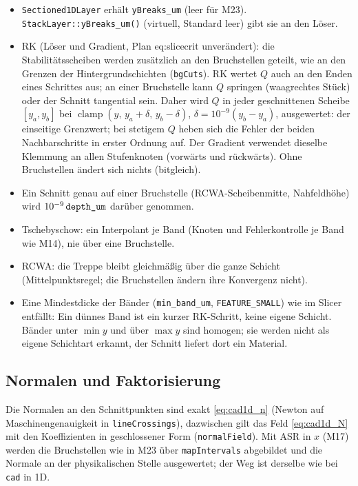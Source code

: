 \begin{itemize}[nosep]
  \item \verb|Sectioned1DLayer| erhält \verb|yBreaks_um| (leer für M23). \verb|StackLayer::yBreaks_um()| (virtuell,
        Standard leer) gibt sie an den Löser.
  \item RK (Löser und Gradient, Plan eq:slicecrit unverändert): die Stabilitätsscheiben werden zusätzlich an den
        Bruchstellen geteilt, wie an den Grenzen der Hintergrundschichten (\verb|bgCuts|). RK wertet $Q$ auch an den
        Enden eines Schrittes aus; an einer Bruchstelle kann $Q$ springen (waagrechtes Stück) oder der Schnitt
        tangential sein. Daher wird $Q$ in jeder geschnittenen Scheibe $[y_a,y_b]$ bei
        $\operatorname{clamp}(y,\,y_a+\delta,\,y_b-\delta)$, $\delta=10^{-9}(y_b-y_a)$, ausgewertet: der einseitige
        Grenzwert; bei stetigem $Q$ heben sich die Fehler der beiden Nachbarschritte in erster Ordnung auf. Der
        Gradient verwendet dieselbe Klemmung an allen Stufenknoten (vorwärts und rückwärts). Ohne Bruchstellen ändert
        sich nichts (bitgleich).
  \item Ein Schnitt genau auf einer Bruchstelle (RCWA-Scheibenmitte, Nahfeldhöhe) wird $10^{-9}\,\verb|depth_um|$
        darüber genommen.
  \item Tschebyschow: ein Interpolant je Band (Knoten und Fehlerkontrolle je Band wie M14), nie über eine Bruchstelle.
  \item RCWA: die Treppe bleibt gleichmäßig über die ganze Schicht (Mittelpunktsregel; die Bruchstellen ändern ihre
        Konvergenz nicht).
  \item Eine Mindestdicke der Bänder (\verb|min_band_um|, \verb|FEATURE_SMALL|) wie im Slicer entfällt: Ein dünnes
        Band ist ein kurzer RK-Schritt, keine eigene Schicht. Bänder unter $\min y$ und über $\max y$ sind homogen;
        sie werden nicht als eigene Schichtart erkannt, der Schnitt liefert dort ein Material.
\end{itemize}

\subsection{Normalen und Faktorisierung}
Die Normalen an den Schnittpunkten sind exakt \eqref{eq:cad1d_n} (Newton auf Maschinengenauigkeit in
\verb|lineCrossings|), dazwischen gilt das Feld \eqref{eq:cad1d_N} mit den Koeffizienten in geschlossener Form
(\verb|normalField|). Mit ASR in $x$ (M17) werden die Bruchstellen wie in M23 über \verb|mapIntervals| abgebildet und
die Normale an der physikalischen Stelle ausgewertet; der Weg ist derselbe wie bei \verb|cad| in 1D.

